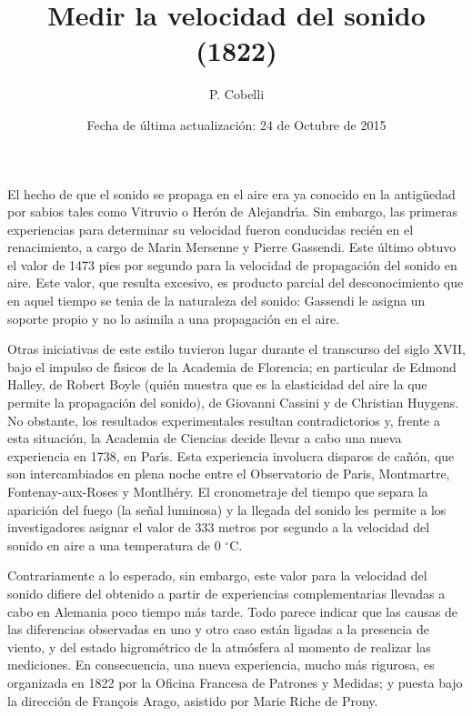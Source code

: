 \documentclass{article}
\begin{document}
\title{Medir la velocidad del sonido (1822)}
\author{P. Cobelli}
\date{Fecha de \'ultima actualizaci\'on: 24 de Octubre de 2015}
\maketitle

El hecho de que el sonido se propaga en el aire era ya conocido en la 
antig\"uedad por sabios tales como Vitruvio o Her\'on de Alejandr\'\i a.
Sin embargo, las primeras experiencias para determinar su velocidad fueron
conducidas reci\'en en el renacimiento, a cargo de Marin Mersenne y Pierre
Gassendi. Este \'ultimo obtuvo el valor de 1473 pies por segundo para la
velocidad de propagaci\'on del sonido en aire. Este valor, que resulta 
excesivo, es producto parcial del desconocimiento que en aquel tiempo se
ten\'\i a de la naturaleza del sonido: Gassendi le asigna un soporte propio
y no lo asimila a una propagaci\'on en el aire.

Otras iniciativas de este estilo tuvieron lugar durante el transcurso del
siglo XVII, bajo el impulso de f\'\i sicos de la Academia de Florencia; 
en particular de Edmond Halley, de Robert Boyle (qui\'en muestra que es la
elasticidad del aire la que permite la propagaci\'on del sonido), de 
Giovanni Cassini y de Christian Huygens. No obstante, los resultados 
experimentales resultan contradictorios y, frente a esta situaci\'on, la
Academia de Ciencias decide llevar a cabo una nueva experiencia en 1738, en
Par\'\i s. Esta experiencia involucra disparos de ca\~n\'on, que son 
intercambiados en plena noche entre el Observatorio de Paris, Montmartre, 
Fontenay-aux-Roses y Montlh\'ery. El cronometraje del tiempo que separa la 
aparici\'on del fuego (la se\~nal luminosa) y la llegada del sonido les 
permite a los investigadores asignar el valor de 333 metros por segundo a
la velocidad del sonido en aire a una temperatura de 0 $^\circ$C. 

Contrariamente a lo esperado, sin embargo, este valor para la velocidad del
sonido difiere del obtenido a partir de experiencias complementarias llevadas
a cabo en Alemania poco tiempo m\'as tarde. Todo parece indicar que las causas
de las diferencias observadas en uno y otro caso est\'an ligadas a la 
presencia de viento, y del estado higrom\'etrico de la atm\'osfera al momento
de realizar las mediciones. En consecuencia, una nueva experiencia, mucho 
m\'as rigurosa, es organizada en 1822 por la Oficina Francesa de Patrones y 
Medidas; y puesta bajo la direcci\'on de Fran\c cois Arago, asistido por 
Marie Riche de Prony. 
\end{document}
